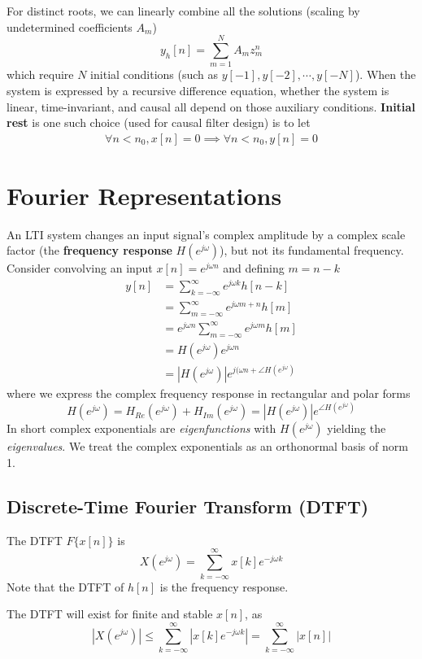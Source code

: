 \documentclass{article}
\newcommand{\jw}{{j\omega}}
\newcommand{\sumkinfty}{\sum_{k=-\infty}^\infty}
\begin{document}
For distinct roots, we can linearly combine all the solutions (scaling by undetermined coefficients $A_m$)
\[
    y_h[n] = \sum_{m=1}^N A_mz_m^n
\]
which require $N$ initial conditions (such as $y[-1], y[-2], \cdots, y[-N]$). When the system is expressed by a recursive difference equation, whether the system is linear, time-invariant, and causal all depend on those auxiliary conditions. \textbf{Initial rest} is one such choice (used for causal filter design) is to let
\begin{align}
	\forall n<n_0, x[n] = 0 \implies \forall n<n_0, y[n] = 0
\end{align}

\section{Fourier Representations}
An LTI system changes an input signal's complex amplitude by a complex scale factor (the \textbf{frequency response} $H(e^{j\omega})$), but not its fundamental frequency. Consider convolving an input $x[n]=e^{j \omega n}$ and defining $m=n-k$
\begin{align*}
   y[n] &= \sum_{k=-\infty}^\infty e^{j\omega k}h[n-k]\\
        &= \sum_{m=-\infty}^\infty e^{j\omega {m + n}}h[m]\\
        &= e^{j\omega n}\sum_{m=-\infty}^\infty e^{j\omega {m}}h[m]\\
        &= H(e^{j\omega})e^{j\omega n}\\
        &= \left|H(e^{j\omega})\right|e^{j(\omega n + \angle H(e^{j\omega})}
\end{align*}
where we express the complex frequency response in rectangular and polar forms
\[
    H(e^{j\omega})= H_{Re}(e^{j\omega}) + H_{Im}(e^{j\omega}) = \left|H(e^{j\omega})\right|e^{\angle H(e^{j\omega})}
\]
In short complex exponentials are \textit{eigenfunctions} with $H(e^{j\omega})$ yielding the \textit{eigenvalues}. We treat the complex exponentials as an orthonormal basis of norm 1.
\subsection{Discrete-Time Fourier Transform (DTFT)}
The DTFT $F\{x[n]\}$ is \[
    X(e^{j\omega}) = \sumkinfty x[k]e^{-\jw k}
\]
Note that the DTFT of $h[n]$ is the frequency response.

The DTFT will exist for finite and stable $x[n]$, as
\[
    |X(e^{j\omega})| \le \sumkinfty \left|x[k]e^{-\jw k}\right| = \sumkinfty |x[n]|
\]
\end{document}

